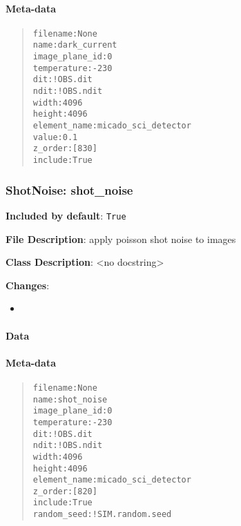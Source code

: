 \paragraph{Meta-data%
  \label{id6}%
}

\begin{quote}
\begin{alltt}
      filename : None
          name : dark_current
image_plane_id : 0
   temperature : -230
           dit : !OBS.dit
          ndit : !OBS.ndit
         width : 4096
        height : 4096
  element_name : micado_sci_detector
         value : 0.1
       z_order : [830]
       include : True
\end{alltt}
\end{quote}


\subsubsection{ShotNoise: \textquotedbl{}shot\_noise\textquotedbl{}%
  \label{shotnoise-shot-noise}%
}

\textbf{Included by default}: \texttt{True}

\textbf{File Description}: apply poisson shot noise to images

\textbf{Class Description}: <no docstring>

\textbf{Changes}:

\begin{itemize}
\item \end{itemize}


\paragraph{Data%
  \label{id7}%
}


\paragraph{Meta-data%
  \label{id8}%
}

\begin{quote}
\begin{alltt}
      filename : None
          name : shot_noise
image_plane_id : 0
   temperature : -230
           dit : !OBS.dit
          ndit : !OBS.ndit
         width : 4096
        height : 4096
  element_name : micado_sci_detector
       z_order : [820]
       include : True
   random_seed : !SIM.random.seed
\end{alltt}
\end{quote}



